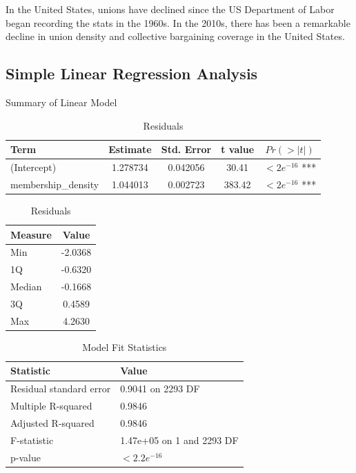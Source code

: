 \documentclass[11pt]{article}\usepackage[]{graphicx}\usepackage[]{xcolor}
\begin{document}
In the United States, unions have declined since the US Department of Labor began recording the stats in the 1960s. In the 2010s, there has been a remarkable decline in union density and collective bargaining coverage in the United States.
\subsection{Simple Linear Regression Analysis}
\begin{table}[ht]
\centering
\begin{minipage}[b]{0.48\linewidth}
\centering
\caption{Summary of Linear Model}
\begin{tabular}{@{}lcccc@{}}
\toprule
Term                & Estimate  & Std. Error & t value & $Pr(>|t|)$      \\ 
\midrule
(Intercept)         & 1.278734  & 0.042056   & 30.41   & $<2e^{-16}$ *** \\
membership\_density & 1.044013  & 0.002723   & 383.42  & $<2e^{-16}$ *** \\
\bottomrule
\end{tabular}
\label{tab:modelsummary}
\end{minipage}\hfill
\begin{minipage}[b]{0.48\linewidth}
\centering
\caption{Residuals}
\begin{tabular}{@{}lc@{}}
\toprule
Measure & Value      \\ 
\midrule
Min     & -2.0368    \\
1Q      & -0.6320    \\
Median  & -0.1668    \\
3Q      & 0.4589     \\
Max     & 4.2630     \\
\bottomrule
\end{tabular}
\label{tab:residuals}
\end{minipage}
\end{table}

\begin{table}[ht]
\centering
\caption{Model Fit Statistics}
\begin{tabular}{@{}ll@{}}
\toprule
Statistic                       & Value           \\
\midrule
Residual standard error         & 0.9041 on 2293 DF \\
Multiple R-squared              & 0.9846           \\
Adjusted R-squared              & 0.9846           \\
F-statistic                     & 1.47e+05 on 1 and 2293 DF \\
p-value                         & $<2.2e^{-16}$    \\
\bottomrule
\end{tabular}
\label{tab:modelfitstats}
\end{table}
\end{document}
